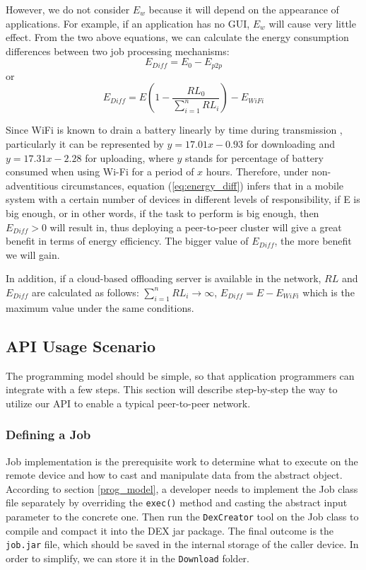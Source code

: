 \documentclass{sig-alternate}[10pt]
\begin{document}
\begin{CCSXML}
However, we do not consider $E_{w}$ because it will depend on the appearance of applications. For example, if an application has no GUI, $E_{w}$ will cause very little effect. From the two above equations, we can calculate the energy consumption differences between two job processing mechanisms:
$$E_{Diff} = E_{0} - E_{p2p}$$ 
or 
\begin{equation}
\label{eq:energy_diff}
E_{Diff} = E(1 - \frac{RL_{0}}{\sum_{i=1}^{n}{RL_{i}}}) - E_{WiFi}
\end{equation}

Since WiFi is known to drain a battery linearly by time during transmission \cite{wifi_energy}, particularly it can be represented by $y = 17.01x - 0.93$ for downloading and $y = 17.31x - 2.28$ for uploading, where $y$ stands for percentage of battery consumed when using Wi-Fi for a period of $x$ hours. Therefore, under non-adventitious circumstances, equation (\ref{eq:energy_diff}) infers that in a mobile system with a certain number of devices in different levels of responsibility, if E is big enough, or in other words, if the task to perform is big enough, then $E_{Diff} > 0$ will result in, thus deploying a peer-to-peer cluster will give a great benefit in terms of energy efficiency. The bigger value of $E_{Diff}$, the more benefit we will gain. 

In addition, if a cloud-based offloading server is available in the network, $RL$ and $E_{Diff}$ are calculated as follows: $\sum_{i=1}^{n}{RL_{i}} \rightarrow \infty$, $E_{Diff} = E - E_{WiFi}$ which is the maximum value under the same conditions.

\subsection{API Usage Scenario}
The programming model should be simple, so that application programmers can integrate with a few steps. This section will describe step-by-step the way to utilize our API to enable a typical peer-to-peer network.

\subsubsection{Defining a Job}
Job implementation is the prerequisite work to determine what to execute on the remote device and how to cast and manipulate data from the abstract object. According to section \ref{prog_model}, a developer needs to implement the Job class file separately by overriding the \texttt{exec()} method and casting the abstract input parameter to the concrete one. Then run the \texttt{DexCreator} tool on the Job class to compile and compact it into the DEX jar package. The final outcome is the \texttt{job.jar} file, which should be saved in the internal storage of the caller device. In order to simplify, we can store it in the \texttt{Download} folder.  


\end{CCSXML}
\end{document}
